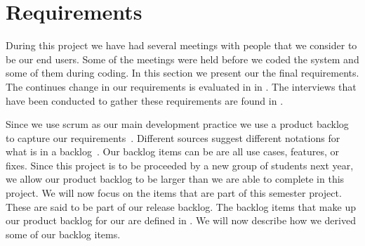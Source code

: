 \section{Requirements}
\label{sec:requirements}
During this project we have had several meetings with people that we consider to be our end users.
Some of the meetings were held before we coded the system and some of them during coding.
In this section we present our the final requirements.
The continues change in our requirements is evaluated in  in .
The interviews that have been conducted to gather these requirements are found in .

Since we use scrum as our main development practice we use a product backlog to capture our requirements~\cite[p.~114]{Larman04}.
Different sources suggest different notations for what is in a backlog~\cite[p.~17]{scrumchecklist}\cite[pp.~123-124]{Larman04}.
Our backlog items can be are all use cases, features, or fixes.
Since this project is to be proceeded by a new group of students next year, we allow our product backlog to be larger than we are able to complete in this project.
We will now focus on the items that are part of this semester project.
These are said to be part of our release backlog.
The backlog items that make up our product backlog for our \subsystem{} are defined in .
We will now describe how we derived some of our backlog items.

